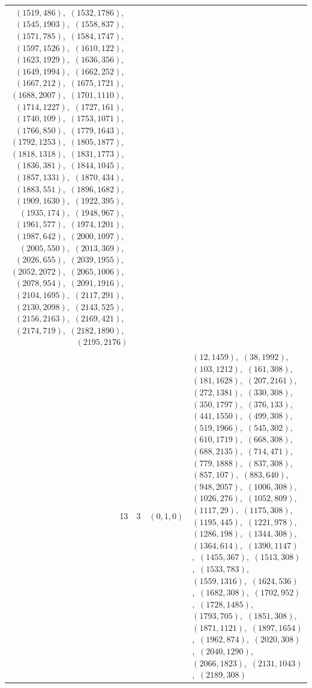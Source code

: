 \documentclass[11pt]{article}
\begin{document}
\begin{longtable}{@{}rrl>{\raggedright\arraybackslash}p{}@{}}
$(1519,486)$,\allowbreak\ $(1532,1786)$,\allowbreak\ $(1545,1903)$,\allowbreak\ $(1558,837)$,\allowbreak\ $(1571,785)$,\allowbreak\ $(1584,1747)$,\allowbreak\ $(1597,1526)$,\allowbreak\ $(1610,122)$,\allowbreak\ $(1623,1929)$,\allowbreak\ $(1636,356)$,\allowbreak\ $(1649,1994)$,\allowbreak\ $(1662,252)$,\allowbreak\ $(1667,212)$,\allowbreak\ $(1675,1721)$,\allowbreak\ $(1688,2007)$,\allowbreak\ $(1701,1110)$,\allowbreak\ $(1714,1227)$,\allowbreak\ $(1727,161)$,\allowbreak\ $(1740,109)$,\allowbreak\ $(1753,1071)$,\allowbreak\ $(1766,850)$,\allowbreak\ $(1779,1643)$,\allowbreak\ $(1792,1253)$,\allowbreak\ $(1805,1877)$,\allowbreak\ $(1818,1318)$,\allowbreak\ $(1831,1773)$,\allowbreak\ $(1836,381)$,\allowbreak\ $(1844,1045)$,\allowbreak\ $(1857,1331)$,\allowbreak\ $(1870,434)$,\allowbreak\ $(1883,551)$,\allowbreak\ $(1896,1682)$,\allowbreak\ $(1909,1630)$,\allowbreak\ $(1922,395)$,\allowbreak\ $(1935,174)$,\allowbreak\ $(1948,967)$,\allowbreak\ $(1961,577)$,\allowbreak\ $(1974,1201)$,\allowbreak\ $(1987,642)$,\allowbreak\ $(2000,1097)$,\allowbreak\ $(2005,550)$,\allowbreak\ $(2013,369)$,\allowbreak\ $(2026,655)$,\allowbreak\ $(2039,1955)$,\allowbreak\ $(2052,2072)$,\allowbreak\ $(2065,1006)$,\allowbreak\ $(2078,954)$,\allowbreak\ $(2091,1916)$,\allowbreak\ $(2104,1695)$,\allowbreak\ $(2117,291)$,\allowbreak\ $(2130,2098)$,\allowbreak\ $(2143,525)$,\allowbreak\ $(2156,2163)$,\allowbreak\ $(2169,421)$,\allowbreak\ $(2174,719)$,\allowbreak\ $(2182,1890)$,\allowbreak\ $(2195,2176)$\\
13 & 3 & $(0,1,0)$ & $(12,1459)$,\allowbreak\ $(38,1992)$,\allowbreak\ $(103,1212)$,\allowbreak\ $(161,308)$,\allowbreak\ $(181,1628)$,\allowbreak\ $(207,2161)$,\allowbreak\ $(272,1381)$,\allowbreak\ $(330,308)$,\allowbreak\ $(350,1797)$,\allowbreak\ $(376,133)$,\allowbreak\ $(441,1550)$,\allowbreak\ $(499,308)$,\allowbreak\ $(519,1966)$,\allowbreak\ $(545,302)$,\allowbreak\ $(610,1719)$,\allowbreak\ $(668,308)$,\allowbreak\ $(688,2135)$,\allowbreak\ $(714,471)$,\allowbreak\ $(779,1888)$,\allowbreak\ $(837,308)$,\allowbreak\ $(857,107)$,\allowbreak\ $(883,640)$,\allowbreak\ $(948,2057)$,\allowbreak\ $(1006,308)$,\allowbreak\ $(1026,276)$,\allowbreak\ $(1052,809)$,\allowbreak\ $(1117,29)$,\allowbreak\ $(1175,308)$,\allowbreak\ $(1195,445)$,\allowbreak\ $(1221,978)$,\allowbreak\ $(1286,198)$,\allowbreak\ $(1344,308)$,\allowbreak\ $(1364,614)$,\allowbreak\ $(1390,1147)$,\allowbreak\ $(1455,367)$,\allowbreak\ $(1513,308)$,\allowbreak\ $(1533,783)$,\allowbreak\ $(1559,1316)$,\allowbreak\ $(1624,536)$,\allowbreak\ $(1682,308)$,\allowbreak\ $(1702,952)$,\allowbreak\ $(1728,1485)$,\allowbreak\ $(1793,705)$,\allowbreak\ $(1851,308)$,\allowbreak\ $(1871,1121)$,\allowbreak\ $(1897,1654)$,\allowbreak\ $(1962,874)$,\allowbreak\ $(2020,308)$,\allowbreak\ $(2040,1290)$,\allowbreak\ $(2066,1823)$,\allowbreak\ $(2131,1043)$,\allowbreak\ $(2189,308)$\\

\end{longtable}
\end{document}
